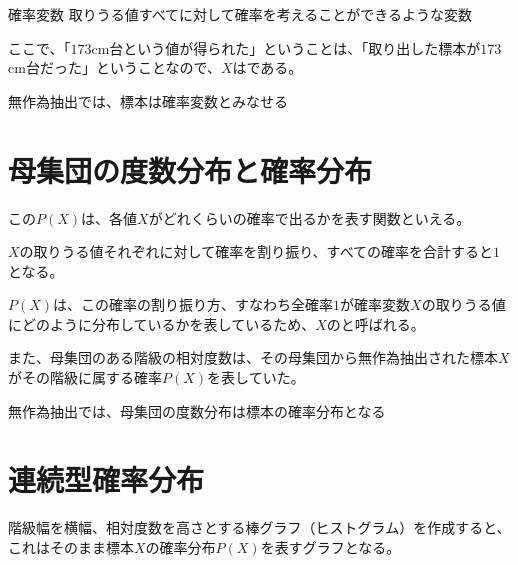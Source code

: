 \documentclass[../../../topic_statistics]{subfiles}
\begin{document}
\begin{definition}{確率変数}
  取りうる値すべてに対して確率を考えることができるような変数
\end{definition}

ここで、「$173$cm台という値が得られた」ということは、「取り出した標本が$173$cm台だった」ということなので、$X$はである。

\begin{emphabox}
  \begin{spacebox}
    \begin{center}
      無作為抽出では、標本は確率変数とみなせる
    \end{center}
  \end{spacebox}
\end{emphabox}

\sectionline
\section{母集団の度数分布と確率分布}

この$P(X)$は、各値$X$がどれくらいの確率で出るかを表す関数といえる。

\br

$X$の取りうる値それぞれに対して確率を割り振り、すべての確率を合計すると$1$となる。

$P(X)$は、この確率の割り振り方、すなわち全確率$1$が確率変数$X$の取りうる値にどのように分布しているかを表しているため、$X$のと呼ばれる。

\br

また、母集団のある階級の相対度数は、その母集団から無作為抽出された標本$X$がその階級に属する確率$P(X)$を表していた。

\begin{emphabox}
  \begin{spacebox}
    \begin{center}
      無作為抽出では、母集団の度数分布は標本の確率分布となる
    \end{center}
  \end{spacebox}
\end{emphabox}

\sectionline
\section{連続型確率分布}

階級幅を横幅、相対度数を高さとする棒グラフ（ヒストグラム）を作成すると、これはそのまま標本$X$の確率分布$P(X)$を表すグラフとなる。
\end{document}
